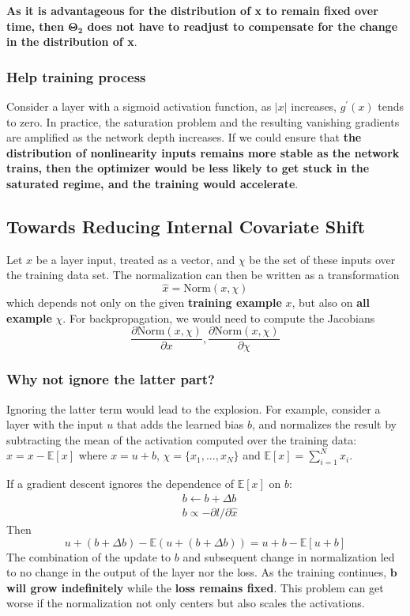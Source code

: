 \documentclass[a4paper, 12pt]{book} %
\begin{document}
\textbf{As it is advantageous for the distribution of x to remain fixed over time, then $\mathbf{\Theta_2}$ does not have to readjust to compensate for the change in the distribution of x}.

\subsubsection{Help training process}
Consider a layer with a sigmoid activation function, as $|x|$ increases, $g^{'}{(x)}$ tends to zero. In practice, the saturation problem and the resulting vanishing gradients are amplified as the network depth increases. If we could ensure that \textbf{the distribution of nonlinearity inputs remains more stable as the network trains, then the optimizer would be less likely to get stuck in the saturated regime, and the training would accelerate}.

\subsection{Towards Reducing Internal Covariate Shift}
Let $x$ be a layer input, treated as a vector, and $\chi$ be the set of these inputs over the training data set. The normalization can then be written as a transformation
$$\hat{x}=\mathrm{Norm}{(x, \chi)}$$ which depends not only on the given \textbf{training example} $x$, but also on \textbf{all example} $\chi$. For backpropagation, we would need to compute the Jacobians
\begin{equation}
\frac{\partial{\mathrm{Norm}{(x,\chi)}}}{\partial{x}}, \frac{\partial{\mathrm{Norm}{(x,\chi)}}}{\partial{\chi}}
\end{equation} 

\subsubsection{Why not ignore the latter part?}
Ignoring the latter term would lead to the explosion. For example, consider a layer
with the input $u$ that adds the learned bias $b$, and normalizes the result by subtracting the mean of the activation computed over the training data: $\hat{x}=x-\mathbb{E}[x]$ where $x=u+b$, $\chi=\{x_1,...,x_N\}$ and $\mathbb{E}[x]=\sum_{i=1}^{N}x_i$.
 
If a gradient descent ignores the dependence of $\mathbb{E}[x]$ on $b$:
\begin{equation}
\begin{split}
	& b \leftarrow b + \Delta{b} \\
    & b \propto -\partial{l} / \partial{\hat{x}}
\end{split}
\end{equation}
Then 
$$u+(b + \Delta{b})-\mathbb{E}{(u+(b + \Delta{b}))}=u+b-\mathbb{E}{[u+b]}$$
The combination of the update to $b$ and subsequent change in normalization led to no change in the output of the layer nor the loss. As the training continues, \textbf{$\mathbf{b}$ will grow indefinitely} while the \textbf{loss remains fixed}. This problem can get worse if the normalization not only centers but also scales the activations.
\end{document}
